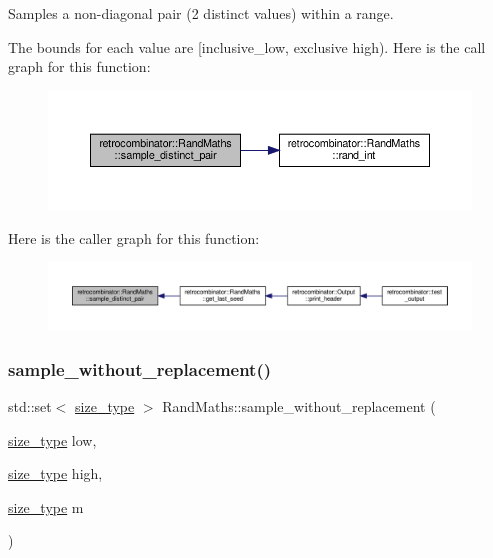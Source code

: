 Samples a non-\/diagonal pair (2 distinct values) within a range. 

The bounds for each value are \mbox{[}inclusive\+\_\+low, exclusive high). Here is the call graph for this function\+:
\nopagebreak
\begin{figure}[H]
\begin{center}
\leavevmode
\includegraphics[width=350pt]{classretrocombinator_1_1RandMaths_a2758ba7c9818bc664c4b751a697e1fe6_cgraph}
\end{center}
\end{figure}
Here is the caller graph for this function\+:
\nopagebreak
\begin{figure}[H]
\begin{center}
\leavevmode
\includegraphics[width=350pt]{classretrocombinator_1_1RandMaths_a2758ba7c9818bc664c4b751a697e1fe6_icgraph}
\end{center}
\end{figure}
\mbox{\label{classretrocombinator_1_1RandMaths_a6a7fe159f46afec51d997e4d07d2cfe6}} 
\subsubsection{\texorpdfstring{sample\+\_\+without\+\_\+replacement()}{sample\_without\_replacement()}}
{\footnotesize\ttfamily std\+::set$<$ \hyperlink{namespaceretrocombinator_a8e1541b50cee66a791df4c437ccbb385}{size\+\_\+type} $>$ Rand\+Maths\+::sample\+\_\+without\+\_\+replacement (\begin{DoxyParamCaption}\item[{\hyperlink{namespaceretrocombinator_a8e1541b50cee66a791df4c437ccbb385}{size\+\_\+type}}]{low,  }\item[{\hyperlink{namespaceretrocombinator_a8e1541b50cee66a791df4c437ccbb385}{size\+\_\+type}}]{high,  }\item[{\hyperlink{namespaceretrocombinator_a8e1541b50cee66a791df4c437ccbb385}{size\+\_\+type}}]{m }\end{DoxyParamCaption})}



